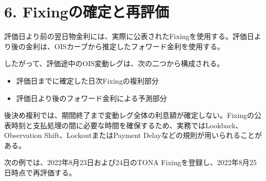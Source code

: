 \documentclass[
  letterpaper,
  DIV=11,
  numbers=noendperiod]{scrreprt}
\providecommand{\tightlist}{%
  \setlength{\itemsep}{0pt}\setlength{\parskip}{0pt}}
\begin{document}
\section{6.
Fixingの確定と再評価}\label{fixingux306eux78baux5b9aux3068ux518dux8a55ux4fa1}

評価日より前の翌日物金利には、実際に公表されたFixingを使用する。評価日より後の金利は、OISカーブから推定したフォワード金利を使用する。

したがって、評価途中のOIS変動レグは、次の二つから構成される。

\begin{itemize}
\tightlist
\item
  評価日までに確定した日次Fixingの複利部分
\item
  評価日より後のフォワード金利による予測部分
\end{itemize}

後決め複利では、期間終了まで変動レグ全体の利息額が確定しない。Fixingの公表時刻と支払処理の間に必要な時間を確保するため、実務ではLookback、Observation
Shift、LockoutまたはPayment Delayなどの規則が用いられることがある。

次の例では、2022年8月23日および24日のTONA
Fixingを登録し、2022年8月25日時点で再評価する。
\end{document}
